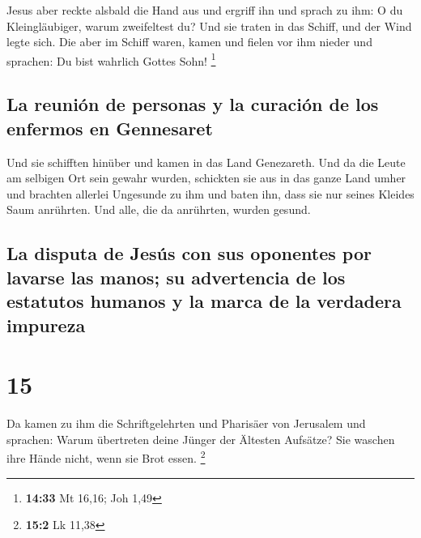 Jesus aber reckte alsbald die Hand aus und ergriff ihn
und sprach zu ihm: O du Kleingläubiger, warum zweifeltest du?
 Und sie traten in das Schiff, und der Wind legte sich.
 Die aber im Schiff waren, kamen und fielen vor ihm
nieder und sprachen: Du bist wahrlich Gottes Sohn! \footnote{\textbf{14:33}
  Mt 16,16; Joh 1,49}

\hypertarget{la-reuniuxf3n-de-personas-y-la-curaciuxf3n-de-los-enfermos-en-gennesaret}{%
\subsection{La reunión de personas y la curación de los enfermos en
Gennesaret}\label{la-reuniuxf3n-de-personas-y-la-curaciuxf3n-de-los-enfermos-en-gennesaret}}

 Und sie schifften hinüber und kamen in das Land
Genezareth.  Und da die Leute am selbigen Ort sein gewahr
wurden, schickten sie aus in das ganze Land umher und brachten allerlei
Ungesunde zu ihm  und baten ihn, dass sie nur seines
Kleides Saum anrührten. Und alle, die da anrührten, wurden gesund.

\hypertarget{la-disputa-de-jesuxfas-con-sus-oponentes-por-lavarse-las-manos-su-advertencia-de-los-estatutos-humanos-y-la-marca-de-la-verdadera-impureza}{%
\subsection{La disputa de Jesús con sus oponentes por lavarse las manos;
su advertencia de los estatutos humanos y la marca de la verdadera
impureza}\label{la-disputa-de-jesuxfas-con-sus-oponentes-por-lavarse-las-manos-su-advertencia-de-los-estatutos-humanos-y-la-marca-de-la-verdadera-impureza}}

\hypertarget{section-14}{%
\section{15}\label{section-14}}

 Da kamen zu ihm die Schriftgelehrten und Pharisäer von
Jerusalem und sprachen:  Warum übertreten deine Jünger der
Ältesten Aufsätze? Sie waschen ihre Hände nicht, wenn sie Brot essen.
\footnote{\textbf{15:2} Lk 11,38}

